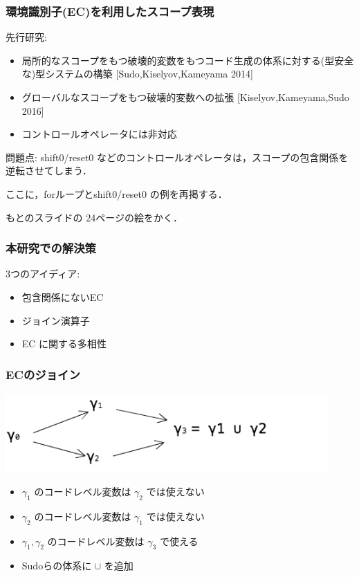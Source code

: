\begin{frame}
  \frametitle{環境識別子(EC)を利用したスコープ表現}

先行研究:
\begin{itemize}
\item 局所的なスコープをもつ破壊的変数をもつコード生成の体系に対する(型安全な)型システムの構築
 [Sudo,Kiselyov,Kameyama 2014]
\item グローバルなスコープをもつ破壊的変数への拡張 
 [Kiselyov,Kameyama,Sudo 2016]
\item コントロールオペレータには非対応
\end{itemize}

\medskip
問題点:
shift0/reset0 などのコントロールオペレータは，スコープの包含関係を逆転させてしまう．
\end{frame}

\begin{frame}
ここに，forループとshift0/reset0 の例を再掲する．

もとのスライドの 24ページの絵をかく．
\end{frame}

\begin{frame}
\frametitle{本研究での解決策}

3つのアイディア:
\begin{itemize}
\item 包含関係にないEC 
\item ジョイン演算子
\item EC に関する多相性
\end{itemize}

\end{frame}


\begin{frame}
  \frametitle{ECのジョイン}
  \flushleft
  \includegraphics[clip,height=3cm]{./img/ecgraph.png}
  \begin{itemize}
  \item<2-> $\gamma_1$ のコードレベル変数は $\gamma_2$ では使えない
  \item<3-> $\gamma_2$ のコードレベル変数は $\gamma_1$ では使えない
  \item<4-> $\gamma_1, \gamma_2$ のコードレベル変数は $\gamma_3$ で使える
  \item<5->[$\Rightarrow$] Sudoらの体系に $\cup$ を追加
  \end{itemize}
\end{frame}

